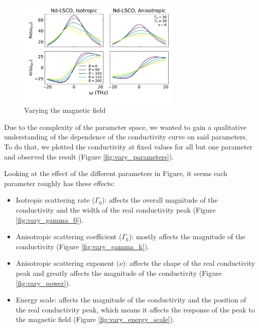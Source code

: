 \begin{figure}
    \centering
    \includegraphics[width=0.7\textwidth]{figures/vary_field}
    \caption{Varying the magnetic field}
    \label{fig:vary_field}
\end{figure}


Due to the complexity of the parameter space, 
we wanted to gain a qualitative understanding of the dependence of the conductivity curve on said parameters. 
To do that, we plotted the conductivity at fixed values for all but one parameter and observed the result
(Figure \ref{fig:vary_parameters}).

Looking at the effect of the different parameters in Figure, it seems each parameter roughly has
these effects:
\begin{itemize}
    \item Isotropic scattering rate ($\Gamma_0$): affects the overall magnitude of the conductivity
        and the width of the real conductivity peak (Figure \ref{fig:vary_gamma_0}).
    \item Anisotropic scattering coefficient ($\Gamma_k$): mostly affects the magnitude of the
        conductivity (Figure \ref{fig:vary_gamma_k}).
    \item Anisotropic scattering exponent ($\nu$): affects the shape of the real conductivity peak
        and greatly affects the magnitude of the conductivity (Figure \ref{fig:vary_power}).
    \item Energy scale: affects the magnitude of the conductivity and the position of the real
        conductivity peak, which means it affects the response of the peak to the magnetic field
        (Figure \ref{fig:vary_energy_scale}).
\end{itemize}

